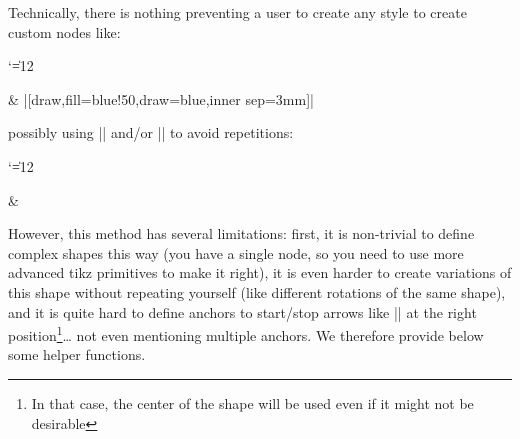 \documentclass[a4paper,doc2]{ltxdoc} %
\begin{document}
{Technically, there is nothing preventing a user to create any style to create custom nodes like:
{\catcode`\|=12 %
\begin{codeexample}[width=0pt]
  \begin{ZX}
    \zxN{} \rar & |[draw,fill=blue!50,draw=blue,inner sep=3mm]| 
  \end{ZX}
\end{codeexample}
}
possibly using |\tikzset| and/or |\NewExpandableDocumentCommand| to avoid repetitions:
{\catcode`\|=12 %
\begin{codeexample}[width=0pt]
  \begin{ZX}
    \zxN{} \rar & 
  \end{ZX}
\end{codeexample}
}
However, this method has several limitations: first, it is non-trivial to define complex shapes this way (you have a single node, so you need to use more advanced tikz primitives to make it right), it is even harder to create variations of this shape without repeating yourself (like different rotations of the same shape), and it is quite hard to define anchors to start/stop arrows like |\rar[<']| at the right position\footnote{In that case, the center of the shape will be used even if it might not be desirable}… not even mentioning multiple anchors. We therefore provide below some helper functions.

}
\end{document}
